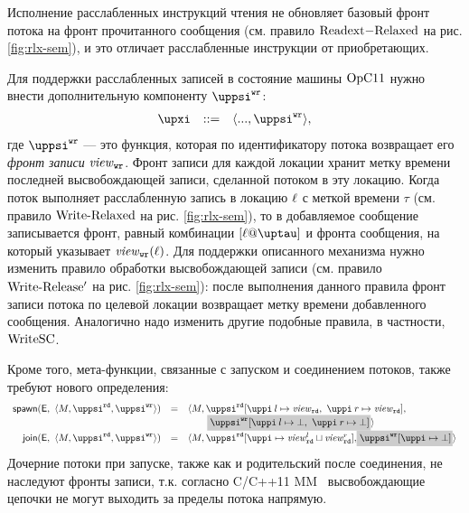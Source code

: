 Исполнение расслабленных инструкций чтения не обновляет
базовый фронт потока на фронт прочитанного сообщения
(см. правило ${\rm Read	ext{-}Relaxed}$ на рис. \ref{fig:rlx-sem}), и это отличает
расслабленные инструкции от приобретающих.

Для поддержки расслабленных записей в состояние машины $\mathrm{OpC11}$ нужно внести дополнительную компоненту $\stPsiWrite$:
%
\[\begin{array}{rcl}
\auxX      & ::= & \angled{..., \stPsiWrite},
\end{array}\]
%
где $\stPsiWrite$ --- это функция, которая по идентификатору потока возвращает его \emph{фронт записи} $\mathit{view}_{\text{\scriptsize{\texttt{wr}}}}$.
Фронт записи для каждой локации хранит метку времени последней высвобождающей записи, сделанной потоком в эту локацию.
Когда поток выполняет расслабленную запись в локацию $\ell$ с меткой времени $\tau$
(см. правило ${\rm Write\text{-}Relaxed}$ на рис. \ref{fig:rlx-sem}),
то в добавляемое сообщение записывается фронт, равный комбинации $[\loc@\tau]$ и фронта сообщения, на который указывает
$\mathit{view}_{\text{\scriptsize{\texttt{wr}}}}(\ell)$.
Для поддержки описанного механизма нужно изменить правило обработки высвобождающей записи
(см. правило ${\rm Write\text{-}Release'}$ на рис. \ref{fig:rlx-sem}): после выполнения данного правила фронт записи потока
по целевой локации возвращает метку времени добавленного сообщения. Аналогично надо изменить другие подобные правила,
в частности, ${\rm WriteSC}$.

Кроме того, мета-функции, связанные с запуском и соединением потоков, также требуют нового определения:
\[
\begin{array}{r c l}
\spawn{\EvalContext}{\angled{\stEta,\stPsiRead,\stPsiWrite}} & = &
\angled{\stEta,
\stPsiRead[\stpath\:l \mapsto \stSigmaRead,~\stpath\:r \mapsto \stSigmaRead], \\
& & \quad ~~~ \graybox{\stPsiWrite[\stpath\:l \mapsto \bot,~\stpath\:r \mapsto \bot]}} \\

\joinP{\EvalContext}{\angled{\stEta, \stPsiRead, \stPsiWrite}} & = &
\angled{\stEta, \stPsiRead[\stpath \mapsto \stSigmaRead^{l} \sqcup \stSigmaRead^{r}],
  \graybox{\stPsiWrite[\stpath \mapsto \bot]}}
\end{array}
\]
Дочерние потоки при запуске, также как и родительский после соединения, не наследуют
фронты записи, т.к. согласно C/C++11 MM~\cite{Batty-al:POPL11}
высвобождающие цепочки не могут выходить за пределы потока напрямую.

